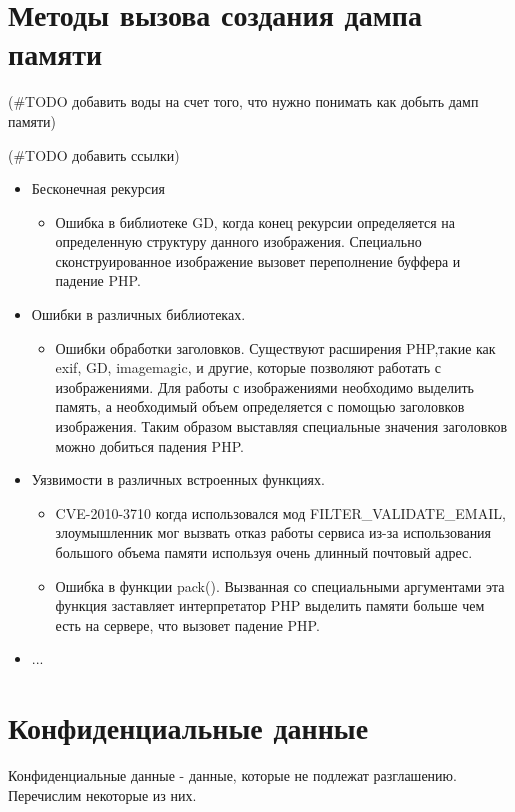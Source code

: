 \documentclass[20pt]{article}
\begin{document}
\newpage

\section{Методы вызова создания дампа памяти}

(#TODO добавить воды на счет того, что нужно понимать как добыть дамп памяти)

(#TODO добавить ссылки)
\begin{itemize}
  \item  Бесконечная рекурсия
    \begin{itemize}
      \item Ошибка в библиотеке GD, когда конец рекурсии определяется на определенную
      структуру данного изображения. Специально сконструированное изображение вызовет
      переполнение буффера и падение PHP.
    \end{itemize}
  \item Ошибки в различных библиотеках.
    \begin{itemize}
      \item Ошибки обработки заголовков. Существуют расширения PHP,такие как exif, GD,
        imagemagic, и другие, которые позволяют работать с изображениями. Для работы
        с изображениями необходимо выделить память, а необходимый объем определяется
        с помощью заголовков изображения. Таким образом выставляя специальные значения
        заголовков можно добиться падения PHP.
    \end{itemize}
  \item Уязвимости в различных встроенных функциях.
    \begin{itemize}
      \item CVE-2010-3710 когда использовался мод FILTER\_VALIDATE\_EMAIL, злоумышленник
        мог вызвать отказ работы сервиса из-за использования большого объема памяти
        используя очень длинный почтовый адрес.
      \item Ошибка в функции pack(). Вызванная со специальными аргументами эта функция
        заставляет интерпретатор PHP выделить памяти больше чем есть на сервере, что
        вызовет падение PHP.
    \end{itemize}
 \item ...
\end{itemize}

\newpage

\section{Конфиденциальные данные}
Конфиденциальные данные - данные, которые не подлежат разглашению. Перечислим
некоторые из них.
\end{document}
